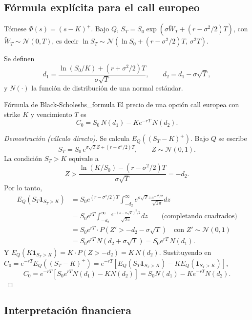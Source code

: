 \documentclass[11pt, a4paper]{article}
\begin{document}
\subsection{Fórmula explícita para el call europeo}

Tómese $\Phi(s) = (s - K)^+$. Bajo $Q$, $S_T = S_0 \exp(\sigma \widetilde{W}_T + (r -
\sigma^2/2) T)$, con $\widetilde{W}_T \sim \mathcal{N}(0, T)$, es decir
$\ln S_T \sim \mathcal{N}(\ln S_0 + (r - \sigma^2/2) T, \ \sigma^2 T)$.

Se definen
$$ d_1 = \frac{\ln(S_0/K) + (r + \sigma^2/2) T}{\sigma \sqrt{T}}, \qquad
d_2 = d_1 - \sigma \sqrt{T}, $$
y $N(\cdot)$ la función de distribución de una normal estándar.

\begin{teorema}{Fórmula de Black-Scholes}{bs_formula}
El precio de una opción call europea con strike $K$ y vencimiento $T$ es
$$ C_0 = S_0 \, N(d_1) - K e^{-rT} \, N(d_2). $$
\end{teorema}

\begin{proof}[Demostración (cálculo directo)]
Se calcula $E_Q((S_T - K)^+)$. Bajo $Q$ se escribe
$$ S_T = S_0 \, e^{\sigma \sqrt{T} Z + (r - \sigma^2/2) T}, \qquad Z \sim \mathcal{N}(0, 1). $$
La condición $S_T > K$ equivale a
$$ Z > \frac{\ln(K/S_0) - (r - \sigma^2/2) T}{\sigma \sqrt{T}} = -d_2. $$
Por lo tanto,
\begin{align*}
E_Q(S_T \mathbf{1}_{S_T > K}) &= S_0 e^{(r - \sigma^2/2) T} \int_{-d_2}^\infty e^{\sigma \sqrt{T} z}
\frac{e^{-z^2/2}}{\sqrt{2\pi}} dz \\
&= S_0 e^{rT} \int_{-d_2}^\infty \frac{e^{-(z - \sigma\sqrt{T})^2/2}}{\sqrt{2\pi}} dz
\qquad \text{(completando cuadrados)} \\
&= S_0 e^{rT} \cdot P(Z' > -d_2 - \sigma\sqrt{T}) \quad \text{con } Z' \sim \mathcal{N}(0,1) \\
&= S_0 e^{rT} \, N(d_2 + \sigma\sqrt{T}) = S_0 e^{rT} \, N(d_1).
\end{align*}
Y $E_Q(K \mathbf{1}_{S_T > K}) = K \cdot P(Z > -d_2) = K \, N(d_2)$. Sustituyendo en
$C_0 = e^{-rT} E_Q((S_T - K)^+) = e^{-rT}[E_Q(S_T \mathbf{1}_{S_T > K}) - K E_Q(\mathbf{1}_{S_T >
K})]$,
$$ C_0 = e^{-rT}[S_0 e^{rT} N(d_1) - K N(d_2)] = S_0 N(d_1) - K e^{-rT} N(d_2). $$
\end{proof}

\subsection{Interpretación financiera}
\end{document}
